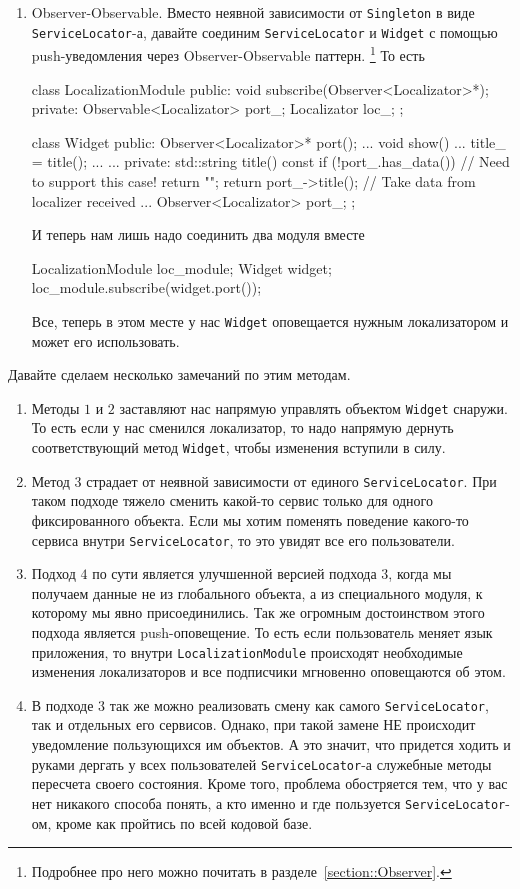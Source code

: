 \begin{enumerate}
\item Observer-Observable.
Вместо неявной зависимости от \verb"Singleton" в виде \verb"ServiceLocator"-а, давайте соединим \verb"ServiceLocator" и \verb"Widget" с помощью push-уведомления через Observer-Observable паттерн.%
\footnote{Подробнее про него можно почитать в разделе~\ref{section::Observer}.}
То есть
\begin{cppcode}
class LocalizationModule {
public:
  void subscribe(Observer<Localizator>*);
private:
  Observable<Localizator> port_;
  Localizator loc_;
};

class Widget {
public:
  Observer<Localizator>* port();
  ...
  void show() {
    ...
    title_ = title();
    ...
  }
  ...
private:  
  std::string title() const {
    if (!port_.has_data())  // Need to support this case!
      return "";
    return port_->title();  // Take data from localizer received
  }
  ...
  Observer<Localizator> port_;
};
\end{cppcode}
И теперь нам лишь надо соединить два модуля вместе
\begin{cppcode}
LocalizationModule loc_module;
Widget widget;
loc_module.subscribe(widget.port());
\end{cppcode}
Все, теперь в этом месте у нас \verb"Widget" оповещается нужным локализатором и может его использовать.
\end{enumerate}
Давайте сделаем несколько замечаний по этим методам.
\begin{enumerate}
\item Методы $1$ и $2$ заставляют нас напрямую управлять объектом \verb"Widget" снаружи.
То есть если у нас сменился локализатор, то надо напрямую дернуть соответствующий метод \verb"Widget", чтобы изменения вступили в силу.

\item Метод $3$ страдает от неявной зависимости от единого \verb"ServiceLocator".
При таком подходе тяжело сменить какой-то сервис только для одного фиксированного объекта.
Если мы хотим поменять поведение какого-то сервиса внутри \verb"ServiceLocator", то это увидят все его пользователи.

\item Подход $4$ по сути является улучшенной версией подхода $3$, когда мы получаем данные не из глобального объекта, а из специального модуля, к которому мы явно присоединились.
Так же огромным достоинством этого подхода является push-оповещение.
То есть если пользователь меняет язык приложения, то внутри \verb"LocalizationModule" происходят необходимые изменения локализаторов и все подписчики мгновенно оповещаются об этом.

\item В подходе $3$ так же можно реализовать смену как самого \verb"ServiceLocator", так и отдельных его сервисов.
Однако, при такой замене НЕ происходит уведомление пользующихся им объектов.
А это значит, что придется ходить и руками дергать у всех пользователей \verb"ServiceLocator"-а служебные методы пересчета своего состояния.
Кроме того, проблема обостряется тем, что у вас нет никакого способа понять, а кто именно и где пользуется \verb"ServiceLocator"-ом, кроме как пройтись по всей кодовой базе.
\end{enumerate}
